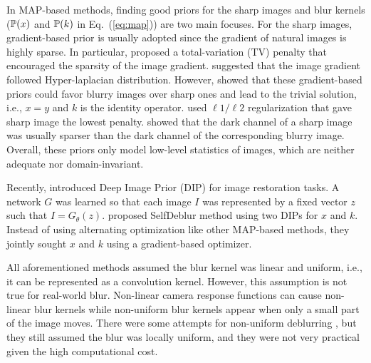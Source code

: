 \documentclass[final]{cvpr}
\newcommand{\Eref}[1]{Eq.~(\ref{#1})}
\newcommand{\minisection}[1]{\vspace{1mm}\noindent{\bf #1}}
\begin{document}
\minisection{MAP-based blind image deblurring.}
In MAP-based methods, finding good priors for the sharp images and blur kernels ($\mathbb{P}(x)$ and $\mathbb{P}(k)$ in \Eref{eq:map}) are two main focuses. For the sharp images, gradient-based prior is usually adopted since the gradient of natural images is highly sparse. In particular, \citet{chan1998total} proposed a total-variation (TV) penalty that encouraged the sparsity of the image gradient. \citet{krishnan2009fast} suggested that the image gradient followed Hyper-laplacian distribution. However, \citet{levin2009understanding} showed that these gradient-based priors could favor blurry images over sharp ones and lead to the trivial solution, i.e., $x = y$ and $k$ is the identity operator. \citet{krishnan2011blind} used $\ell1/\ell2$ regularization that gave sharp image the lowest penalty. \citet{pan2016blind} showed that the dark channel of a sharp image was usually sparser than the dark channel of the corresponding blurry image. Overall, these priors only model low-level statistics of images, which are neither adequate nor domain-invariant. 

Recently, \citet{ulyanov2018deep} introduced Deep Image Prior (DIP)  for image restoration tasks. A network $G$ was learned so that each image $I$ was represented by a fixed vector $z$ such that $I = G_{\theta}(z)$. \citet{ren2020neural} proposed SelfDeblur method using two DIPs for $x$ and $k$. Instead of using alternating optimization like other MAP-based methods, they jointly sought $x$ and $k$ using a gradient-based optimizer.

All aforementioned methods assumed the blur kernel was linear and uniform, i.e., it can be represented as a convolution kernel. However, this assumption is not true for real-world blur. Non-linear camera response functions can cause non-linear blur kernels while non-uniform blur kernels appear when only a small part of the image moves. There were some attempts for non-uniform deblurring \cite{whyte2012non,cho2007removing,nagy1998restoring,shan2007rotational}, but they still assumed the blur was locally uniform, and they were not very practical given the high computational cost.
\end{document}
